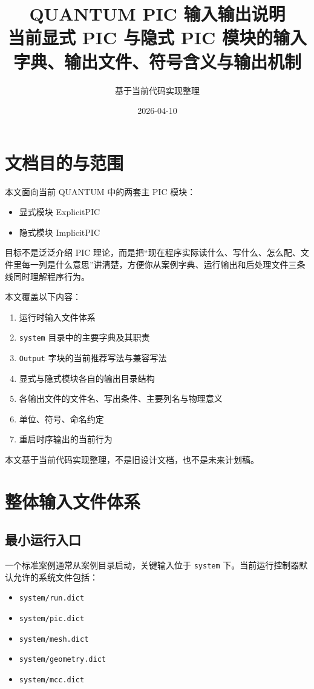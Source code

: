 \documentclass[11pt,a4paper]{ctexart}
\title{QUANTUM PIC 输入输出说明\\\large 当前显式 PIC 与隐式 PIC 模块的输入字典、输出文件、符号含义与输出机制}
\author{基于当前代码实现整理}
\date{2026-04-10}
\newcommand{\code}[1]{\texttt{#1}}
\newcommand{\file}[1]{\texttt{#1}}
\begin{document}
\maketitle
\tableofcontents
\newpage

\section{文档目的与范围}

本文面向当前 QUANTUM 中的两套主 PIC 模块：

\begin{itemize}
  \item 显式模块 ExplicitPIC
  \item 隐式模块 ImplicitPIC
\end{itemize}

目标不是泛泛介绍 PIC 理论，而是把``现在程序实际读什么、写什么、怎么配、文件里每一列是什么意思''讲清楚，方便你从案例字典、运行输出和后处理文件三条线同时理解程序行为。

本文覆盖以下内容：

\begin{enumerate}
  \item 运行时输入文件体系
  \item \file{system} 目录中的主要字典及其职责
  \item 
  \code{Output} 字块的当前推荐写法与兼容写法
  \item 显式与隐式模块各自的输出目录结构
  \item 各输出文件的文件名、写出条件、主要列名与物理意义
  \item 单位、符号、命名约定
  \item 重启时序输出的当前行为
\end{enumerate}

本文基于当前代码实现整理，不是旧设计文档，也不是未来计划稿。

\section{整体输入文件体系}

\subsection{最小运行入口}

一个标准案例通常从案例目录启动，关键输入位于 \file{system} 下。当前运行控制器默认允许的系统文件包括：

\begin{itemize}
  \item \file{system/run.dict}
  \item \file{system/pic.dict}
  \item \file{system/mesh.dict}
  \item \file{system/geometry.dict}
  \item \file{system/mcc.dict}
\end{itemize}
\end{document}
